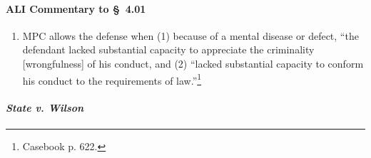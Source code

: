 \paragraph{ALI Commentary to § 4.01}

\begin{enumerate}
    \item MPC allows the defense when (1) because of a mental disease or defect, ``the defendant lacked substantial capacity to appreciate the criminality [wrongfulness] of his conduct, and (2) ``lacked substantial capacity to conform his conduct to the requirements of law.''\footnote{Casebook p. 622.}
\end{enumerate}

\paragraph{\emph{State v. Wilson}}

